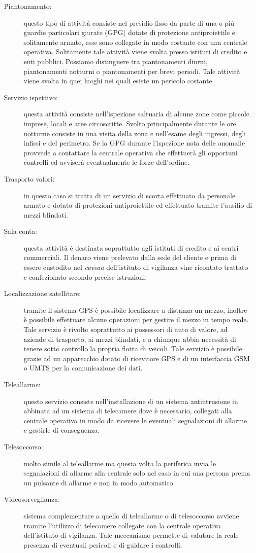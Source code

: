 \begin{description}
	\item[Piantonamento:] questo tipo di attività consiste nel presidio fisso da parte di una o più guardie particolari giurate (GPG) dotate di protezione antiproiettile e solitamente armate, esse sono collegate in modo costante con una centrale operativa. Solitamente tale attività viene svolta presso istituti di credito e enti pubblici. Possiamo distinguere tra piantonamenti diurni, piantonamenti notturni o piantonamenti per brevi periodi. Tale attività viene svolta in quei luoghi nei quali esiste un pericolo costante.
	\item[Servizio ispettivo:] questa attività consiste nell'ispezione saltuaria di alcune zone come piccole imprese, locali e aree circoscritte. Svolto principalmente durante le ore notturne consiste in una visita della zona e nell'esame degli ingressi, degli infissi e del perimetro. Se la GPG durante l'ispezione nota delle anomalie provvede a contattare la centrale operativa che effettuerà gli opportuni controlli ed avviserà eventualmente le forze dell'ordine.
	\item[Trasporto valori:] in questo caso si tratta di un servizio di scorta effettuato da personale armato e dotato di protezioni antiproiettile ed effettuato tramite l'ausilio di mezzi blindati.
	\item[Sala conta:] questa attività è destinata soprattutto agli istituti di credito e ai centri commerciali. Il denaro viene prelevato dalla sede del cliente e prima di essere custodito nel \emph{caveau} dell'istituto di vigilanza vine ricontato trattato e confezionato secondo precise istruzioni.
	\item[Localizzazione satellitare:] tramite il sistema GPS è possibile localizzare a distanza un mezzo, inoltre è possibile effettuare alcune operazioni per gestire il mezzo in tempo reale. Tale servizio è rivolto soprattutto ai possessori di auto di valore, ad aziende di trasporto, ai mezzi blindati, e a chiunque abbia necessità di tenere sotto controllo la propria flotta di veicoli. Tale servizio è possibile grazie ad un apparecchio dotato di ricevitore GPS e di un interfaccia GSM o UMTS per la comunicazione dei dati.
	\item[Teleallarme:] questo servizio consiste nell'installazione di un sistema antintrusione in abbinata ad un sistema di telecamere dove è necessario, collegati alla centrale operativa in modo da ricevere le eventuali segnalazioni di allarme e gestirle di conseguenza.
	\item[Telesoccorso:] molto simile al teleallarme ma questa volta la periferica invia le segnalazioni di allarme alla centrale solo nel caso in cui una persona prema un pulsante di allarme e non in modo automatico.
	\item[Videosorveglianza:] sistema complementare a quello di teleallarme o di telesoccorso avviene tramite l'utilizzo di telecamere collegate con la centrale operativa dell'istituto di vigilanza. Tale meccanismo permette di valutare la reale presenza di eventuali pericoli e di guidare i controlli.
\end{description}
